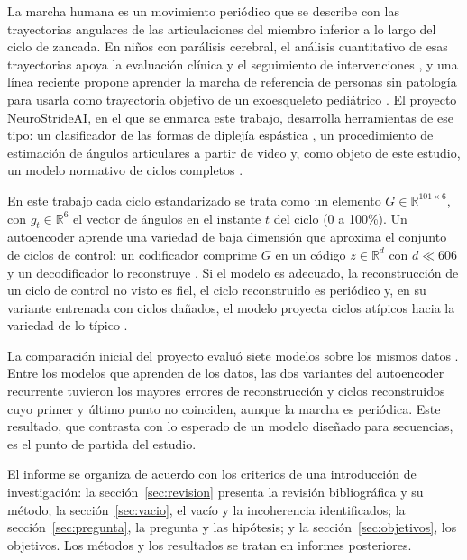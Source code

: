 \documentclass[11pt,a4paper]{article}
\newcommand{\R}{\mathbb{R}}
\begin{document}
La marcha humana es un movimiento periódico que se describe con las trayectorias angulares de las articulaciones del miembro inferior a lo largo del ciclo de zancada. En niños con parálisis cerebral, el análisis cuantitativo de esas trayectorias apoya la evaluación clínica y el seguimiento de intervenciones \cite{schwartz2008,baker2009}, y una línea reciente propone aprender la marcha de referencia de personas sin patología para usarla como trayectoria objetivo de un exoesqueleto pediátrico \cite{kolaghassi2023}. El proyecto NeuroStrideAI, en el que se enmarca este trabajo, desarrolla herramientas de ese tipo: un clasificador de las formas de diplejía espástica \cite{ferrari2019}, un procedimiento de estimación de ángulos articulares a partir de video y, como objeto de este estudio, un modelo normativo de ciclos completos \cite{neurostride2026}.

En este trabajo cada ciclo estandarizado se trata como un elemento $G\in\R^{101\times 6}$, con $g_t\in\R^6$ el vector de ángulos en el instante $t$ del ciclo (0 a 100\%). Un autoencoder aprende una variedad de baja dimensión que aproxima el conjunto de ciclos de control: un codificador comprime $G$ en un código $z\in\R^d$ con $d\ll 606$ y un decodificador lo reconstruye \cite{hinton2006}. Si el modelo es adecuado, la reconstrucción de un ciclo de control no visto es fiel, el ciclo reconstruido es periódico y, en su variante entrenada con ciclos dañados, el modelo proyecta ciclos atípicos hacia la variedad de lo típico \cite{vincent2008}.

La comparación inicial del proyecto evaluó siete modelos sobre los mismos datos \cite{neurostride2026}. Entre los modelos que aprenden de los datos, las dos variantes del autoencoder recurrente tuvieron los mayores errores de reconstrucción y ciclos reconstruidos cuyo primer y último punto no coinciden, aunque la marcha es periódica. Este resultado, que contrasta con lo esperado de un modelo diseñado para secuencias, es el punto de partida del estudio.

El informe se organiza de acuerdo con los criterios de una introducción de investigación: la sección~\ref{sec:revision} presenta la revisión bibliográfica y su método; la sección~\ref{sec:vacio}, el vacío y la incoherencia identificados; la sección~\ref{sec:pregunta}, la pregunta y las hipótesis; y la sección~\ref{sec:objetivos}, los objetivos. Los métodos y los resultados se tratan en informes posteriores.

\end{document}
